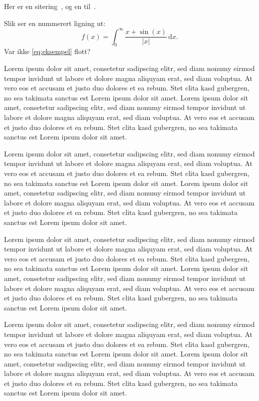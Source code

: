 \documentclass[11pt,a4paper,british]{article}
\begin{document}
Her er en sitering~\cite{einstein}, og en til~\cite{dirac}.

Slik ser en nummerert ligning ut:
\begin{equation}
	\label{eq:eksempel}
	f(x) = \int_0^\infty \frac{x + \sin(x)}{\lvert x \rvert} \, \mathrm{d} x.
\end{equation}
Var ikke \cref{eq:eksempel} flott?

Lorem ipsum dolor sit amet, consetetur sadipscing elitr, sed diam nonumy eirmod tempor invidunt ut labore et dolore magna aliquyam erat, sed diam voluptua. At vero eos et accusam et justo duo dolores et ea rebum. Stet clita kasd gubergren, no sea takimata sanctus est Lorem ipsum dolor sit amet. Lorem ipsum dolor sit amet, consetetur sadipscing elitr, sed diam nonumy eirmod tempor invidunt ut labore et dolore magna aliquyam erat, sed diam voluptua. At vero eos et accusam et justo duo dolores et ea rebum. Stet clita kasd gubergren, no sea takimata sanctus est Lorem ipsum dolor sit amet.

Lorem ipsum dolor sit amet, consetetur sadipscing elitr, sed diam nonumy eirmod tempor invidunt ut labore et dolore magna aliquyam erat, sed diam voluptua. At vero eos et accusam et justo duo dolores et ea rebum. Stet clita kasd gubergren, no sea takimata sanctus est Lorem ipsum dolor sit amet. Lorem ipsum dolor sit amet, consetetur sadipscing elitr, sed diam nonumy eirmod tempor invidunt ut labore et dolore magna aliquyam erat, sed diam voluptua. At vero eos et accusam et justo duo dolores et ea rebum. Stet clita kasd gubergren, no sea takimata sanctus est Lorem ipsum dolor sit amet.

Lorem ipsum dolor sit amet, consetetur sadipscing elitr, sed diam nonumy eirmod tempor invidunt ut labore et dolore magna aliquyam erat, sed diam voluptua. At vero eos et accusam et justo duo dolores et ea rebum. Stet clita kasd gubergren, no sea takimata sanctus est Lorem ipsum dolor sit amet. Lorem ipsum dolor sit amet, consetetur sadipscing elitr, sed diam nonumy eirmod tempor invidunt ut labore et dolore magna aliquyam erat, sed diam voluptua. At vero eos et accusam et justo duo dolores et ea rebum. Stet clita kasd gubergren, no sea takimata sanctus est Lorem ipsum dolor sit amet.

Lorem ipsum dolor sit amet, consetetur sadipscing elitr, sed diam nonumy eirmod tempor invidunt ut labore et dolore magna aliquyam erat, sed diam voluptua. At vero eos et accusam et justo duo dolores et ea rebum. Stet clita kasd gubergren, no sea takimata sanctus est Lorem ipsum dolor sit amet. Lorem ipsum dolor sit amet, consetetur sadipscing elitr, sed diam nonumy eirmod tempor invidunt ut labore et dolore magna aliquyam erat, sed diam voluptua. At vero eos et accusam et justo duo dolores et ea rebum. Stet clita kasd gubergren, no sea takimata sanctus est Lorem ipsum dolor sit amet.
\end{document}
